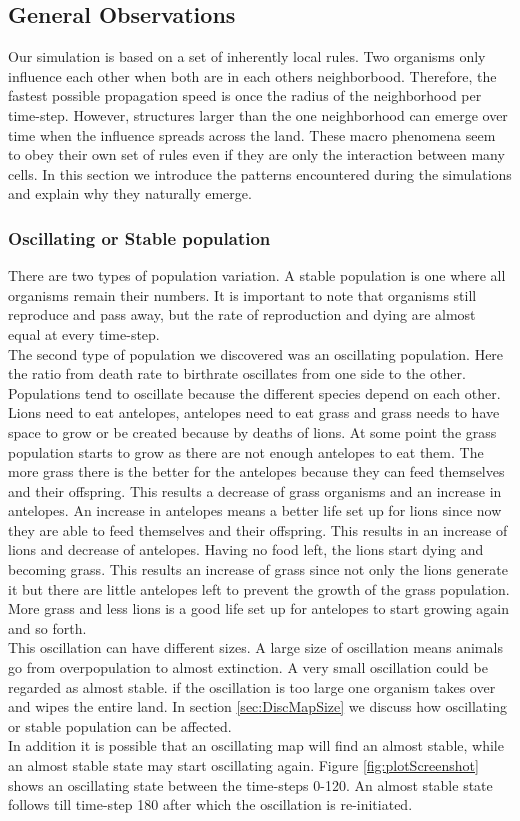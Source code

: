 \documentclass[11pt]{article}
\begin{document}
\subsection{General Observations}
Our simulation is based on a set of inherently local rules. Two organisms only influence each other when both are in each others neighborbood. Therefore, the fastest possible propagation speed is once the radius of the neighborhood per time-step. However, structures larger than the one neighborhood can emerge over time when the influence spreads across the land. These macro phenomena seem to obey their own set of rules even if they are only the interaction between many cells. 
In this section we introduce the patterns encountered during the simulations and explain why they naturally emerge.

\subsubsection{Oscillating or Stable population}
There are two types of population variation. A stable population is one where all organisms remain their numbers. It is important to note that organisms still reproduce and pass away, but the rate of reproduction and dying are almost equal at every time-step.\\
The second type of population we discovered was an oscillating population. Here the ratio from death rate to birthrate oscillates from one side to the other. Populations tend to oscillate because the different species depend on each other. Lions need to eat antelopes, antelopes need to eat grass and grass needs to have space to grow or be created because by deaths of lions. At some point the grass population starts to grow as there are not enough antelopes to eat them. The more grass there is the better for the antelopes because they can feed themselves and their offspring. This results a decrease of grass organisms and an increase in antelopes. An increase in antelopes means a better life set up for lions since now they are able to feed themselves and their offspring. This results in an increase of lions and decrease of antelopes. Having no food left, the lions start dying and becoming grass. This results an increase of grass since not only the lions generate it but there are little antelopes left to prevent the growth of the grass population. More grass and less lions is a good life set up for antelopes to start growing again and so forth.\\
This oscillation can have different sizes. A large size of oscillation means animals go from overpopulation to almost extinction. A very small oscillation could be regarded as almost stable. if the oscillation is too large one organism takes over and wipes the entire land. In section \ref{sec:DiscMapSize} we discuss how oscillating or stable population can be affected.\\
In addition it is possible that an oscillating map will find an almost stable, while an almost stable state may start oscillating again. Figure \ref{fig:plotScreenshot} shows an oscillating state between the time-steps 0-120. An almost stable state follows till time-step 180 after which the oscillation is re-initiated. 
\end{document}

